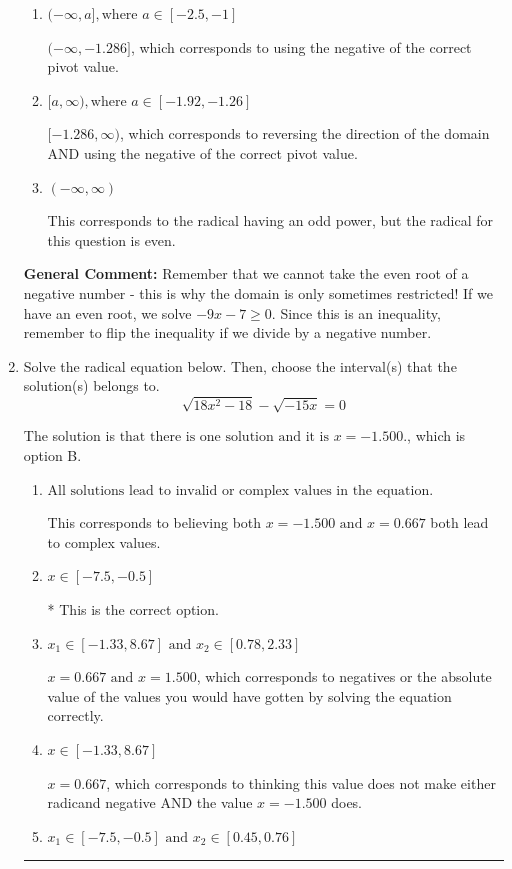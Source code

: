 \documentclass{extbook}[14pt]
\newcommand{\litem}[1]{\item #1

\rule{\textwidth}{0.4pt}}
\begin{document}
\begin{enumerate}
{\begin{enumerate}[label=\Alph*.]
* $(-\infty, -0.778]$, which is the correct option.
\item \( (-\infty, a], \text{where } a \in [-2.5, -1] \)

$(-\infty, -1.286]$, which corresponds to using the negative of the correct pivot value.
\item \( [a, \infty), \text{where } a \in [-1.92, -1.26] \)

$[-1.286, \infty)$, which corresponds to reversing the direction of the domain AND using the negative of the correct pivot value.
\item \( (-\infty, \infty) \)

This corresponds to the radical having an odd power, but the radical for this question is even.
\end{enumerate}

\textbf{General Comment:} Remember that we cannot take the even root of a negative number - this is why the domain is only sometimes restricted! If we have an even root, we solve $-9 x - 7 \geq 0$. Since this is an inequality, remember to flip the inequality if we divide by a negative number.
}
\litem{
Solve the radical equation below. Then, choose the interval(s) that the solution(s) belongs to.
\[ \sqrt{18 x^2 - 18} - \sqrt{-15 x} = 0 \]

The solution is \( \text{that there is one solution and it is } x = -1.500. \), which is option B.\begin{enumerate}[label=\Alph*.]
\item \( \text{All solutions lead to invalid or complex values in the equation.} \)

This corresponds to believing both $x = -1.500 \text{ and } x = 0.667$ both lead to complex values.
\item \( x \in [-7.5,-0.5] \)

* This is the correct option.
\item \( x_1 \in [-1.33, 8.67] \text{ and } x_2 \in [0.78,2.33] \)

$x = 0.667 \text{ and } x = 1.500$, which corresponds to negatives or the absolute value of the values you would have gotten by solving the equation correctly.
\item \( x \in [-1.33,8.67] \)

$x = 0.667$, which corresponds to thinking this value does not make either radicand negative AND the value $x = -1.500$ does.
\item \( x_1 \in [-7.5, -0.5] \text{ and } x_2 \in [0.45,0.76] \)


\end{enumerate}}
\end{enumerate}
\end{document}
